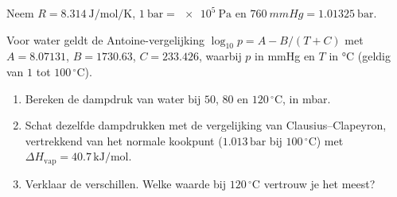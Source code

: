 
Neem $R = \SI{8.314}{\joule\per\mole\per\kelvin}$, $\SI{1}{\bar} = \SI{e5}{\pascal}$ en $\SI{760}{mmHg} = \SI{1.01325}{\bar}$.

\begin{oefening}\label{oef:h5-1}
Voor water geldt de Antoine-vergelijking \(\log_{10} p = A - B/(T + C)\) met \(A = 8.07131\), \(B = 1730.63\), \(C = 233.426\), waarbij \(p\) in mmHg en \(T\) in °C (geldig van \(1\) tot \(100\,^\circ\mathrm{C}\)).

\begin{enumerate}
\item[(a)]
  Bereken de dampdruk van water bij \(50\), \(80\) en \(120\,^\circ\mathrm{C}\), in mbar.
\item[(b)]
  Schat dezelfde dampdrukken met de vergelijking van Clausius--Clapeyron, vertrekkend van het normale kookpunt (\(1.013\,\mathrm{bar}\) bij \(100\,^\circ\mathrm{C}\)) met \(\Delta H_{\text{vap}} = 40.7\,\mathrm{kJ/mol}\).
\item[(c)]
  Verklaar de verschillen. Welke waarde bij \(120\,^\circ\mathrm{C}\) vertrouw je het meest?
\end{enumerate}
\end{oefening}
